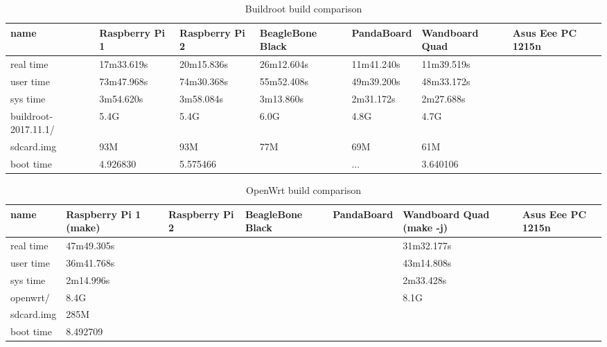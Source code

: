 \documentclass[printmode]{mgr}
\begin{document}
\begin{landscape}



\begin{table}
  \begin{tabular}{| p{2.5cm} | p{3cm} | p{3cm} | p{3cm} | p{3cm} | p{3cm} | p{3cm} |}
    \hline
    name & Raspberry Pi 1 & Raspberry Pi 2 & BeagleBone Black & PandaBoard & Wandboard Quad & Asus Eee PC 1215n \\
    \hline
    real time & 17m33.619s & 20m15.836s & 26m12.604s & 11m41.240s & 11m39.519s &  \\
    \hline
    user time & 73m47.968s & 74m30.368s & 55m52.408s & 49m39.200s & 48m33.172s &  \\
    \hline
    sys time & 3m54.620s & 3m58.084s & 3m13.860s & 2m31.172s & 2m27.688s &  \\
    \hline
    buildroot-2017.11.1/ & 5.4G & 5.4G & 6.0G & 4.8G & 4.7G & \\
    \hline
    sdcard.img & 93M & 93M & 77M & 69M & 61M & \\
    \hline
    boot time & 4.926830 & 5.575466 & & ... & 3.640106 & \\
    \hline
  \end{tabular}
  \caption{Buildroot build comparison}
\end{table}


\begin{table}
  \begin{tabular}{| p{2.5cm} | p{3cm} | p{3cm} | p{3cm} | p{3cm} | p{3cm} | p{3cm} |}
    \hline
    name & Raspberry Pi 1 (make) & Raspberry Pi 2 & BeagleBone Black & PandaBoard & Wandboard Quad (make -j) & Asus Eee PC 1215n \\
    \hline
    real time & 47m49.305s &  &  &  & 31m32.177s &  \\
    \hline
    user time & 36m41.768s &  &  &  & 43m14.808s &  \\
    \hline
    sys time & 2m14.996s &  &  &  & 2m33.428s &  \\
    \hline
    openwrt/ & 8.4G &  &  &  & 8.1G &  \\
    \hline
    sdcard.img & 285M &  &  &  &  &  \\
    \hline
    boot time & 8.492709 &  &  &  &  &  \\
    \hline
  \end{tabular}
  \caption{OpenWrt build comparison}
\end{table}





\end{landscape}
\end{document}
